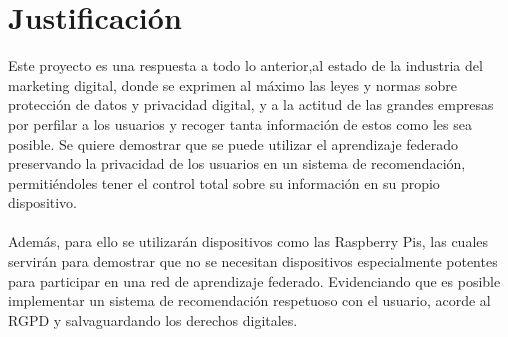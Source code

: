 \section{Justificación}
Este proyecto es una respuesta a todo lo anterior,al estado de la industria del marketing digital, donde se exprimen al máximo las leyes y normas sobre protección de datos y privacidad digital, y a la actitud de las grandes empresas por perfilar a los usuarios y recoger tanta información de estos como les sea posible. Se quiere demostrar que se puede utilizar el aprendizaje federado preservando la privacidad de los usuarios en un sistema de recomendación, permitiéndoles tener el control total sobre su información en su propio dispositivo. 
\\ \\
Además, para ello se utilizarán dispositivos como las Raspberry Pis, las cuales servirán para demostrar que no se necesitan dispositivos especialmente potentes para participar en una red de aprendizaje federado. Evidenciando que es posible implementar un sistema de recomendación respetuoso con el usuario, acorde al RGPD y salvaguardando los derechos digitales.
